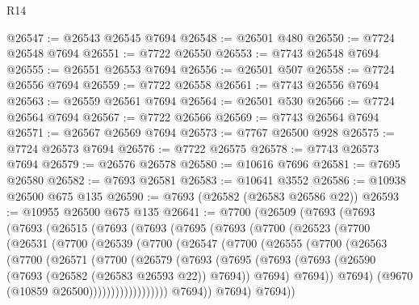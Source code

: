 \begin{lexlean}{R14}
\begin{coremodule}
@26547 := @26543 @26545 @7694
@26548 := @26501 @480
@26550 := @7724 @26548 @7694
@26551 := @7722 @26550
@26553 := @7743 @26548 @7694
@26555 := @26551 @26553 @7694
@26556 := @26501 @507
@26558 := @7724 @26556 @7694
@26559 := @7722 @26558
@26561 := @7743 @26556 @7694
@26563 := @26559 @26561 @7694
@26564 := @26501 @530
@26566 := @7724 @26564 @7694
@26567 := @7722 @26566
@26569 := @7743 @26564 @7694
@26571 := @26567 @26569 @7694
@26573 := @7767 @26500 @928
@26575 := @7724 @26573 @7694
@26576 := @7722 @26575
@26578 := @7743 @26573 @7694
@26579 := @26576 @26578
@26580 := @10616 @7696
@26581 := @7695 @26580
@26582 := @7693 @26581
@26583 := @10641 @3552
@26586 := @10938 @26500 @675 @135
@26590 := @7693 (@26582 (@26583 @26586 @22))
@26593 := @10955 @26500 @675 @135
@26641 := @7700
    (@26509
      (@7693
        (@7693
          (@7693
            (@26515
              (@7693
                (@7693
                  (@7695
                    (@7693
                      (@7700
                        (@26523
                          (@7700
                            (@26531
                              (@7700
                                (@26539
                                  (@7700
                                    (@26547
                                      (@7700
                                        (@26555
                                          (@7700
                                            (@26563
                                              (@7700
                                                (@26571
                                                  (@7700
                                                    (@26579
                                                      (@7693
                                                        (@7695
                                                          (@7693
                                                            (@7693
                                                              (@26590
                                                                (@7693
                                                                  (@26582 (@26583 @26593 @22))
                                                                  @7694))
                                                              @7694)
                                                            @7694))
                                                        @7694)
                                                      (@9670 (@10859 @26500))))))))))))))))))
                      @7694))
                  @7694)
                @7694))

\end{coremodule}
\end{lexlean}

